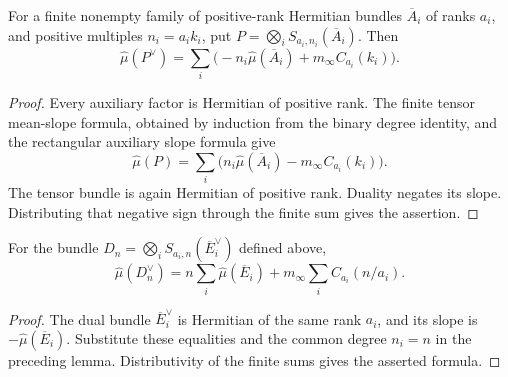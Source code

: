 \begin{lemma}
\label{lem:determinant-specht-product-dual-slope}
\leanok
For a finite nonempty family of positive-rank Hermitian bundles $\overline A_i$
of ranks $a_i$, and positive multiples $n_i=a_i k_i$, put
$P=\bigotimes_i S_{a_i,n_i}(\overline A_i)$. Then
\[
 \widehat\mu(P^{\vee})
   =\sum_i\bigl(-n_i\widehat\mu(\overline A_i)
                       +m_\infty C_{a_i}(k_i)\bigr).
\]
\end{lemma}
\begin{proof}
Every auxiliary factor is Hermitian of positive rank. The finite tensor
mean-slope formula, obtained by induction from the binary degree identity,
and the rectangular auxiliary slope formula give
\[
 \widehat\mu(P)=\sum_i\bigl(n_i\widehat\mu(\overline A_i)
                                  -m_\infty C_{a_i}(k_i)\bigr).
\]
The tensor bundle is again Hermitian of positive rank. Duality negates its
slope. Distributing that negative sign through the finite sum gives the
assertion.
\end{proof}

\begin{corollary}
\label{cor:canonical-pairing-target-slope}
\leanok
For the bundle $D_n=\bigotimes_i S_{a_i,n}(\overline E_i^{\vee})$
defined above,
\[
 \widehat\mu(D_n^{\vee})
   =n\sum_i\widehat\mu(\overline E_i)
       +m_\infty\sum_i C_{a_i}(n/a_i).
\]
\end{corollary}
\begin{proof}
The dual bundle $\overline E_i^{\vee}$ is Hermitian of the same rank $a_i$,
and its slope is $-\widehat\mu(\overline E_i)$. Substitute these equalities
and the common degree $n_i=n$ in the preceding lemma. Distributivity of
the finite sums gives the asserted formula.
\end{proof}

